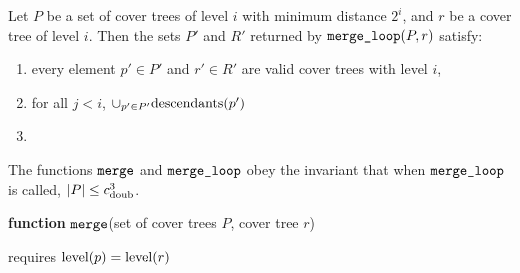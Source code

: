 \documentclass[../main.tex]{subfiles}
\newcommand{\doubnum}{c_\textnormal{doub}}
\newcommand{\mkfunction}[1]{\ifmmode{\text{{#1}}}}
\newcommand{\level}[1]      {\mkfunction{level}({#1})}
\newcommand{\descendants}[1]{\mkfunction{descendants}({#1})}
\newcommand{\mkprocedure}[1]{\textnormal{\ttfamily {#1}}}
\newcommand{\ctmergeloop}{\mkprocedure{merge\_loop}}
\newcommand{\ctmerge}{\ensuremath{\textnormal{\ttfamily merge}}}
\begin{document}
{\begin{lemma}
    Let $P$ be a set of cover trees of level $i$ with minimum distance $2^i$, 
    and $r$ be a cover tree of level $i$.
    Then the sets $P'$ and $R'$ returned by $\ctmergeloop(P,r)$ satisfy:
    \begin{enumerate}
        \item every element $p' \in P'$ and $r'\in R'$ are valid cover trees with level $i$,
        \item for all $j<i$, $\cup_{p' \in P'} \descendants {p'}$
        \item 
    \end{enumerate}
\end{lemma}

\begin{lemma}
    The functions $\ctmerge$ and $\ctmergeloop$ obey the invariant that when $\ctmergeloop$ is called, $|P| \le \doubnum^3$.
\end{lemma}


\newpage
\begin{algorithm}[H]
    \label{alg:merge}
    \vspace{0.1in}
    {\bfseries function} \ctmerge(set of cover trees $P$, cover tree $r$)

    requires $\level{p} = \level{r}$


\end{algorithm}}
\end{document}
